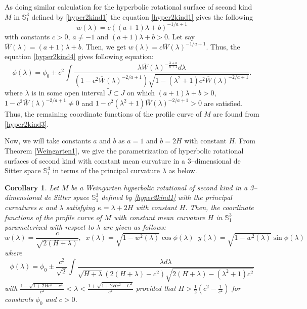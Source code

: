 \documentclass{amsart}
\newtheorem{Corollary}[Theorem]{Corollary}
\theoremstyle{definition}
\numberwithin{equation}{section}
\begin{document}
As doing similar calculation for the hyperbolic rotational surface of second kind $M$ in $\mathbb{S}^3_1$ defined by \eqref{hyper2kind1}
the equation \eqref{hyper2kind1} gives the following
\begin{equation}
    \label{hyper2kind5}
    w(\lambda)=c((a+1)\lambda+b)^{-1/{a+1}}
\end{equation}
with constants $c>0$, $a\neq -1$ and
$(a+1)\lambda+b>0$. 
Let say $\overline{W}(\lambda)=(a+1)\lambda+b$. 
Then, we get $w(\lambda)=c\overline{W}(\lambda)^{-1/{a+1}}$. 
Thus, the equation \eqref{hyper2kind4} gives following equation:
\begin{equation}
    \label{hyper2kind6}
    \phi(\lambda)=\phi_0\pm c^2
    \int{\frac{\lambda \overline{W}(\lambda)^{-\frac{3+a}{a+1}}d\lambda}{
    (1-c^2 \overline{W}(\lambda)^{-2/{a+1}})
    \sqrt{1-(\lambda^2+1)c^2\overline{W}(\lambda)^{-2/{a+1}}}}}.
\end{equation}
where $\lambda$ is in some open interval $\tilde{J}\subset J$ on which
$(a+1)\lambda+b>0$, $1-c^2\bar{W}(\lambda)^{-2/a+1}\neq 0$ 
and 
$1-c^2(\lambda^2+1)\bar{W}(\lambda)^{-2/{a+1}}>0$ are satisfied.
Thus, the remaining coordinate functions of the profile curve of $M$
are found from \eqref{hyper2kind3}.

Now, we will take constants $a$ and $b$ as $a=1$ and $b=2H$ with constant $H$. 
From Theorem \ref{Weingarten1}, we give
the parametrization of hyperbolic rotational surfaces of second kind with constant mean curvature in a 3--dimensional de Sitter space $\mathbb{S}^3_1$ 
in terms of the principal curvature $\lambda$ as below.
\begin{Corollary}
\label{hyper2kindcor1}
Let $M$ be a Weingarten hyperbolic rotational of second kind in a 3--dimensional de Sitter space $\mathbb{S}^3_1$ defined by \eqref{hyper2kind1} with the principal curvatures 
$\kappa$ and
$\lambda$ satisfying $\kappa=\lambda+2H$
with constant $H$. Then, the coordinate functions of the profile curve
of $M$ with constant mean curvature $H$ in $\mathbb{S}^3_1$ parameterized with respect to $\lambda$
are given as follows:
    \begin{equation}
        \label{hyper2kind7}
        w(\lambda)=\frac{c}{\sqrt{2(H+\lambda)}},\;\; 
        x(\lambda)=\sqrt{1-w^2(\lambda)}\cos{\phi(\lambda)}\;\;
        y(\lambda)=\sqrt{1-w^2(\lambda)}\sin{\phi(\lambda)}
    \end{equation}
where 
\begin{equation}
    \label{hyper2kind8}
    \phi(\lambda)=\phi_0\pm\frac{c^2}{\sqrt{2}}
    \int{
    \frac{\lambda d\lambda}
    {\sqrt{H+\lambda}(2(H+\lambda)-c^2)\sqrt{2(H+\lambda)-(\lambda^2+1)c^2}}}
\end{equation}
with 
$\frac{1-\sqrt{1+2Hc^2-c^4}}{c^2}<\lambda<\frac{1+\sqrt{1+2Hc^2-C^4}}{c^2}$
provided that 
$H>\frac{1}{2}\left(c^2-\frac{1}{c^2}\right)$ for 
constants $\phi_0$ and $c>0$.
\end{Corollary}
\end{document}
